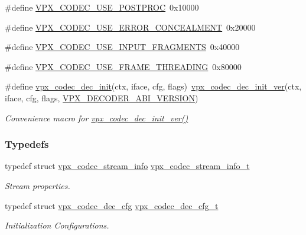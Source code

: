 \begin{DoxyCompactItemize}
\#define \hyperlink{group__decoder_ga6fe14f30254aff769412b128b29664cc}{\-V\-P\-X\-\_\-\-C\-O\-D\-E\-C\-\_\-\-U\-S\-E\-\_\-\-P\-O\-S\-T\-P\-R\-O\-C}~0x10000
\item 
\#define \hyperlink{group__decoder_ga520d7005e360202f5844982fa2392581}{\-V\-P\-X\-\_\-\-C\-O\-D\-E\-C\-\_\-\-U\-S\-E\-\_\-\-E\-R\-R\-O\-R\-\_\-\-C\-O\-N\-C\-E\-A\-L\-M\-E\-N\-T}~0x20000
\item 
\#define \hyperlink{group__decoder_ga378855a0318396d6e4e585bd3bacbf3f}{\-V\-P\-X\-\_\-\-C\-O\-D\-E\-C\-\_\-\-U\-S\-E\-\_\-\-I\-N\-P\-U\-T\-\_\-\-F\-R\-A\-G\-M\-E\-N\-T\-S}~0x40000
\item 
\#define \hyperlink{group__decoder_ga203295122fe98b675f94f4409d4684e0}{\-V\-P\-X\-\_\-\-C\-O\-D\-E\-C\-\_\-\-U\-S\-E\-\_\-\-F\-R\-A\-M\-E\-\_\-\-T\-H\-R\-E\-A\-D\-I\-N\-G}~0x80000
\item 
\#define \hyperlink{group__decoder_ga8c2f0b12f1bd4927eb3c68b01eab19d3}{vpx\-\_\-codec\-\_\-dec\-\_\-init}(ctx, iface, cfg, flags)~\hyperlink{group__decoder_ga26fe82cf8fd697f885935cea53be964f}{vpx\-\_\-codec\-\_\-dec\-\_\-init\-\_\-ver}(ctx, iface, cfg, flags, \hyperlink{group__decoder_ga462b459e7ae13937e1eae1776245db12}{\-V\-P\-X\-\_\-\-D\-E\-C\-O\-D\-E\-R\-\_\-\-A\-B\-I\-\_\-\-V\-E\-R\-S\-I\-O\-N})
\begin{DoxyCompactList}\small\item\em \-Convenience macro for \hyperlink{group__decoder_ga26fe82cf8fd697f885935cea53be964f}{vpx\-\_\-codec\-\_\-dec\-\_\-init\-\_\-ver()} \end{DoxyCompactList}\end{DoxyCompactItemize}
\subsubsection*{\-Typedefs}
\begin{DoxyCompactItemize}
\item 
typedef struct \*
\hyperlink{structvpx__codec__stream__info}{vpx\-\_\-codec\-\_\-stream\-\_\-info} \hyperlink{group__decoder_ga900420e8f7cb9c1b3070b2ba7d636974}{vpx\-\_\-codec\-\_\-stream\-\_\-info\-\_\-t}
\begin{DoxyCompactList}\small\item\em \-Stream properties. \end{DoxyCompactList}\item 
typedef struct \hyperlink{structvpx__codec__dec__cfg}{vpx\-\_\-codec\-\_\-dec\-\_\-cfg} \hyperlink{group__decoder_ga4a2e808eb43f1e798024b5a409c484f9}{vpx\-\_\-codec\-\_\-dec\-\_\-cfg\-\_\-t}
\begin{DoxyCompactList}\small\item\em \-Initialization \-Configurations. \end{DoxyCompactList}\end{DoxyCompactItemize}
